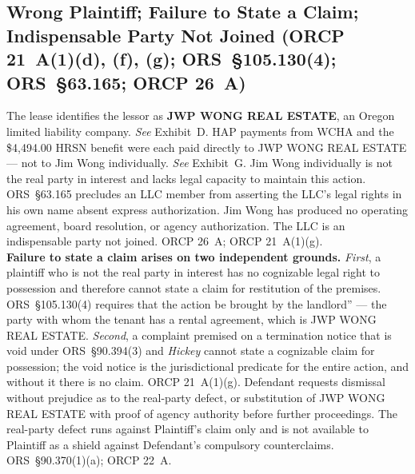 \documentclass[10pt,letterpaper,oneside]{extarticle}
\begin{document}
\subsection{\textbf{Wrong Plaintiff; Failure to State a
		Claim; Indispensable Party Not Joined
		(ORCP 21~A(1)(d), (f), (g); ORS~\S105.130(4);
		ORS~\S63.165; ORCP 26~A)}}
The lease identifies the lessor as \textbf{JWP WONG REAL
	ESTATE}, an Oregon limited liability company.
\textit{See} Exhibit~D. HAP payments from WCHA and the
\$4,494.00 HRSN benefit were each paid directly to JWP WONG
REAL ESTATE --- not to Jim Wong individually.
\textit{See} Exhibit~G. Jim Wong individually is not the
real party in interest and lacks legal capacity to maintain
this action. ORS~\S63.165 precludes an LLC member from
asserting the LLC's legal rights in his own name absent
express authorization. Jim Wong has produced no operating
agreement, board resolution, or agency authorization. The
LLC is an indispensable party not joined. ORCP 26~A;
ORCP 21~A(1)(g).\\
\indent \textbf{Failure to state a claim arises on two
	independent grounds.} \textit{First}, a plaintiff who is
not the real party in interest has no cognizable legal right
to possession and therefore cannot state a claim for
restitution of the premises. ORS~\S105.130(4) requires that
the action be brought by the landlord'' --- the party with
whom the tenant has a rental agreement, which is JWP WONG
REAL ESTATE. \textit{Second}, a complaint premised on a
termination notice that is void under ORS~\S90.394(3) and
\textit{Hickey} cannot state a cognizable claim for
possession; the void notice is the jurisdictional predicate
for the entire action, and without it there is no claim.
ORCP 21~A(1)(g).
\indent Defendant requests dismissal without prejudice as
to the real-party defect, or substitution of JWP WONG REAL
ESTATE with proof of agency authority before further
proceedings. The real-party defect runs against Plaintiff's
claim only and is not available to Plaintiff as a shield
against Defendant's compulsory counterclaims.
ORS~\S90.370(1)(a); ORCP 22~A.
\end{document}
